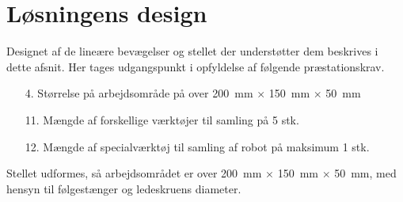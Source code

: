 \section{Løsningens design} \label{Dimensionering af stellet}

Designet af de lineære bevægelser og stellet der understøtter dem beskrives i dette afsnit. Her tages udgangspunkt i opfyldelse af følgende præstationskrav. 

\begin{itemize}
    \item[4.] Størrelse på arbejdsområde på over \SI{200}{mm} $\times$ \SI{150}{mm} $\times$ \SI{50}{mm} 
    \item[11.] Mængde af forskellige værktøjer til samling på 5 stk.
    \item[12.] Mængde af specialværktøj til samling af robot på maksimum 1 stk.
\end{itemize}

Stellet udformes, så arbejdsområdet er over \SI{200}{mm} $\times$ \SI{150}{mm} $\times$ \SI{50}{mm}, med hensyn til følgestænger og ledeskruens diameter. 








